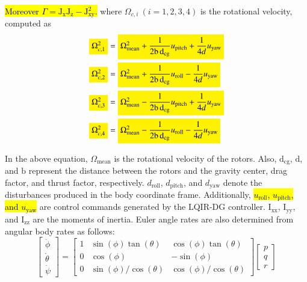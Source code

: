 \documentclass[3p]{elsarticle}
\begin{document}
\hl{Moreover $\Gamma = \mathrm{J}_{\text{x}}\mathrm{J}_{\text{z}} - \mathrm{J}_{\text{xy}}^2$.}
where $\Omega_{c, i}~(i=1, 2, 3, 4)$ is the rotational velocity, computed as
\begin{align}
    \colorbox{yellow}{$\Omega_{c, 1}^2$} &= \colorbox{yellow}{$\Omega_{\text{mean}}^2 + \dfrac{1}{2\mathrm{b\,d}_{\text{cg}}}u_{\text{pitch}} + \dfrac{1}{4d}u_{\text{yaw}}$} \\
    \colorbox{yellow}{$\Omega_{c, 2}^2$} &= \colorbox{yellow}{$\Omega_{\text{mean}}^2 + \dfrac{1}{2\mathrm{b\,d}_{\text{cg}}}u_{\text{roll}} - \dfrac{1}{4d}u_{\text{yaw}}$} \\
    \colorbox{yellow}{$\Omega_{c, 3}^2$} &= \colorbox{yellow}{$\Omega_{\text{mean}}^2 - \dfrac{1}{2\mathrm{b\,d}_{\text{cg}}}u_{\text{pitch}} + \dfrac{1}{4d}u_{\text{yaw}}$} \\
    \colorbox{yellow}{$\Omega_{c, 4}^2$} &= \colorbox{yellow}{$\Omega_{\text{mean}}^2 - \dfrac{1}{2\mathrm{b\,d}_{\text{cg}}}u_{\text{roll}} - \dfrac{1}{4d}u_{\text{yaw}}$}
\end{align}







In the above equation, $\Omega_{\text{mean}}$ is the rotational velocity of the rotors. Also, $\mathrm{d}_{\text{cg}}$, $\text{d}$, and $\text{b}$ represent the distance between the rotors and the gravity center, drag factor, and thrust factor, respectively.
$d_{\text{roll}}$, $d_{\text{pitch}}$, and $d_{\text{yaw}}$ denote the disturbances produced in the body coordinate frame. Additionally,
\hl{$u_{\text{roll}}$, $u_{\text{pitch}}$, and $u_{\text{yaw}}$} are control commands generated by the LQIR-DG controller.
 $\mathrm{I}_{\text{xx}}$, $\mathrm{I}_{\text{yy}}$, and $\mathrm{I}_{\text{zz}}$ are the moments of inertia.
Euler angle rates are also determined from angular body rates as follows:
\begin{equation}
    \begin{bmatrix}
    \dot\phi \\
    \dot\theta \\
    \dot\psi
    \end{bmatrix} = 
    \begin{bmatrix}
    1 & \sin(\phi)\tan(\theta) & \cos(\phi)\tan(\theta) \\
    0 & \cos(\phi) & -\sin(\phi) \\
    0 & \sin(\phi)/\cos(\theta) & \cos(\phi)/\cos(\theta)
    \end{bmatrix}
    \begin{bmatrix}
    p \\
    q \\
    r
    \end{bmatrix}
\end{equation}
\end{document}
